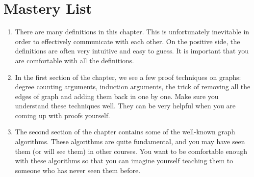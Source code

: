 
\section{Mastery List}

\begin{enumerate}
    \item There are many definitions in this chapter. This is unfortunately inevitable in order to effectively communicate with each other. On the positive side, the definitions are often very intuitive and easy to guess. It is important that you are comfortable with all the definitions.

    \item In the first section of the chapter, we see a few proof techniques on graphs: degree counting arguments, induction arguments, the trick of removing all the edges of graph and adding them back in one by one. Make sure you understand these techniques well. They can be very helpful when you are coming up with proofs yourself.

    \item The second section of the chapter contains some of the well-known graph algorithms. These algorithms are quite fundamental, and you may have seen them (or will see them) in other courses. You want to be comfortable enough with these algorithms so that you can imagine yourself teaching them to someone who has never seen them before.
\end{enumerate}



